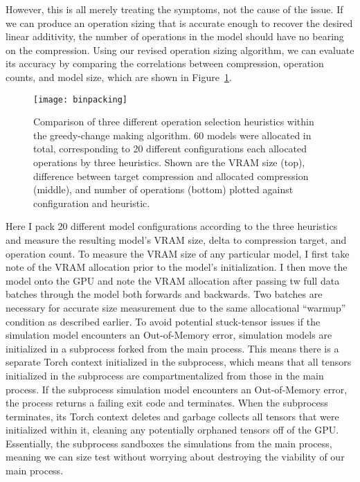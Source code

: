 However, this is all merely treating the symptoms, not the cause of the issue. If we can produce an operation sizing
that is accurate enough to recover the desired linear additivity, the number of operations in the model should have
no bearing on the compression. Using our revised operation sizing algorithm, we can evaluate its accuracy by comparing
the correlations between compression, operation counts, and model size, which are shown in Figure~\ref{fig:changemaking}.

\begin{figure}[ht!]
    \centering
	\texttt{[image: binpacking]} \\
	\caption{Comparison of three different operation selection heuristics within the greedy-change making algorithm.
	60 models were allocated in total, corresponding to 20 different configurations each allocated operations by three
	heuristics.	Shown are the VRAM size (top),  difference between target compression
	and allocated compression (middle), and number of operations (bottom) plotted against configuration and heuristic.}
	\label{fig:changemaking}
\end{figure}

Here I pack 20 different model configurations according to the three heuristics and measure the resulting model's
VRAM size, delta to compression target, and operation count. To measure the VRAM size of any particular model, I first take
note of the VRAM allocation prior to the model's initialization. I then move the model onto the GPU and note the
VRAM allocation after passing tw full data batches through the model both forwards and backwards.
Two batches are necessary for accurate size measurement due to the same allocational ``warmup'' condition as described earlier.
To avoid potential stuck-tensor issues if the simulation model encounters an Out-of-Memory error, simulation models
 are initialized in a subprocess forked from the main process. This means there is a separate Torch context initialized in
the subprocess, which means that all tensors initialized in the subprocess are compartmentalized from those in the
main process. If the subprocess simulation model encounters an Out-of-Memory error, the process returns a failing exit
code and terminates. When the subprocess terminates, its Torch context deletes and garbage collects all tensors
that were initialized within it, cleaning any potentially orphaned tensors off of the GPU.
Essentially, the subprocess sandboxes the simulations from the main process, meaning we can size test without
worrying about destroying the viability of our main process.

